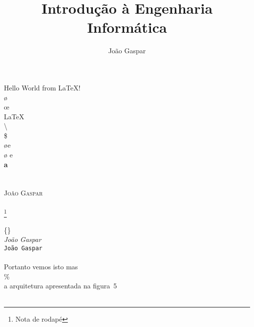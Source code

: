\documentclass[a4paper,11pt,openright,oneside]{report}
\title{\textbf{Introdução à Engenharia Informática}}
\author{João Gaspar}
\date{}
\begin{document}
\maketitle
Hello World from \LaTeX!\\
\o\\
\oe\\ 
\LaTeX\\   
\textbackslash\\
\$\\
\o e\\
{\o} e\\
\textbf{a}\\
\\
\\
\textsc{João Gaspar}\\
\\
\footnote{Nota de rodap\'e}\\
\\
\{\}\\
\textit{João Gaspar}\\
\texttt{João Gaspar}\\
\\
Portanto vemos isto mas %
\\
\%\\
a arquitetura apresentada na figura~5\\
\texttasciitilde\\
\end{document}
